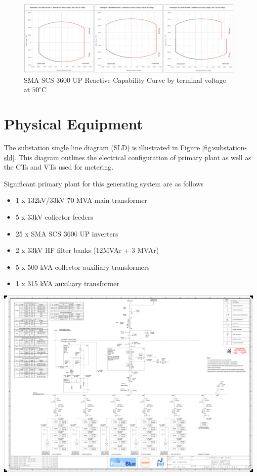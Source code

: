 \documentclass{../grid-link-report}
\begin{document}
	\begin{figure}[H]
		\centering
		\includegraphics[width=1.0\linewidth]{report-assets/inv-q-cap-50degC.png}
		\caption{SMA SCS 3600 UP Reactive Capability Curve by terminal voltage at $50^{\circ}\text{C}$}
		\label{fig:inv-q-capability-50degc}
	\end{figure}	
	
	\chapter{Physical Equipment}
	The substation single line diagram (SLD) is illustrated in Figure \ref{fig:substation-sld}. This diagram outlines the electrical configuration of primary plant as well as the CTs and VTs used for metering.
	
	Significant primary plant for this generating system are as follows
	\begin{itemize}
		\item{1 x 132kV/33kV 70 MVA main transformer}
		\item{5 x 33kV collector feeders}
		\item{25 x SMA SCS 3600 UP inverters}
		\item{2 x 33kV HF filter banks (12MVAr + 3 MVAr)}
		\item{5 x 500 kVA collector auxiliary transformers}
		\item{1 x 315 kVA auxiliary transformer}
		
	\end{itemize}
	
	\begin{landscape}
		\begin{center}
			\includegraphics[width=\linewidth]{References/PSD1834-110-001-001.pdf}
			\label{fig:substation-sld}
		\end{center}
	\end{landscape}
	
\end{document}
